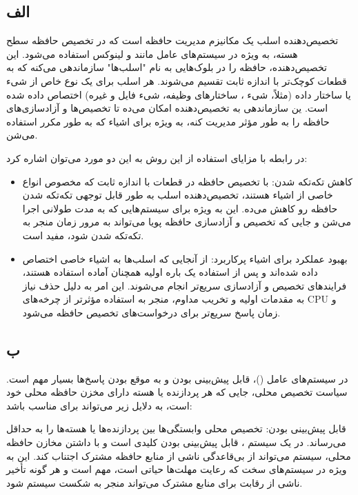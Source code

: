 \subsection*{الف}
تخصیص‌دهنده اسلب یک مکانیزم مدیریت حافظه است که در تخصیص حافظه سطح هسته، به ویژه در سیستم‌های عامل مانند 
و لینوکس استفاده می‌شود. این تخصیص‌دهنده، حافظه را در بلوک‌هایی به نام "اسلب‌ها" سازماندهی می‌کنه که به قطعات کوچک‌تر با اندازه ثابت تقسیم می‌شوند. هر اسلب برای یک نوع خاص از شیء یا ساختار داده (مثلاً، شیء 
، ساختارهای وظیفه، شیء فایل و غیره) اختصاص داده شده است. ین سازماندهی به تخصیص‌دهنده امکان می‌ده تا تخصیص‌ها و آزادسازی‌های حافظه را به طور مؤثر مدیریت کنه، به ویژه برای اشیاء که به طور مکرر استفاده می‌شن.

در رابطه با مزایای استفاده از این روش به این دو مورد می‌توان اشاره کرد:
\begin{itemize}
    \item 
    کاهش تکه‌تکه شدن: با تخصیص حافظه در قطعات با اندازه ثابت که مخصوص انواع خاصی از اشیاء هستند، تخصیص‌دهنده اسلب به طور قابل توجهی تکه‌تکه شدن حافظه رو کاهش می‌ده. این به ویژه برای سیستم‌هایی که به مدت طولانی اجرا می‌شن و جایی که تخصیص و آزادسازی حافظه پویا می‌تواند به مرور زمان منجر به تکه‌تکه شدن شود، مفید است.

    \item
    بهبود عملکرد برای اشیاء پرکاربرد: از آنجایی که اسلب‌ها به اشیاء خاصی اختصاص داده شده‌اند و پس از استفاده یک باره اولیه همچنان آماده استفاده هستند، فرایندهای تخصیص و آزادسازی سریع‌تر انجام می‌شوند. این امر به دلیل حذف نیاز به مقدمات اولیه و تخریب مداوم، منجر به استفاده مؤثرتر از چرخه‌های CPU و زمان پاسخ سریع‌تر برای درخواست‌های تخصیص حافظه می‌شود.
\end{itemize}

\subsection*{ب}
در سیستم‌های عامل  ()، قابل پیش‌بینی بودن و به موقع بودن پاسخ‌ها بسیار مهم است. سیاست تخصیص محلی، جایی که هر پردازنده یا هسته دارای مخزن حافظه محلی خود است، به دلایل زیر می‌تواند برای  مناسب باشد:

قابل پیش‌بینی بودن: تخصیص محلی وابستگی‌ها بین پردازنده‌ها یا هسته‌ها را به حداقل می‌رساند. در یک سیستم ، قابل پیش‌بینی بودن کلیدی است و با داشتن مخازن حافظه محلی، سیستم می‌تواند از بی‌قاعدگی ناشی از منابع حافظه مشترک اجتناب کند. این به ویژه در سیستم‌های  سخت که رعایت مهلت‌ها حیاتی است، مهم است و هر گونه تأخیر ناشی از رقابت برای منابع مشترک می‌تواند منجر به شکست سیستم شود.


